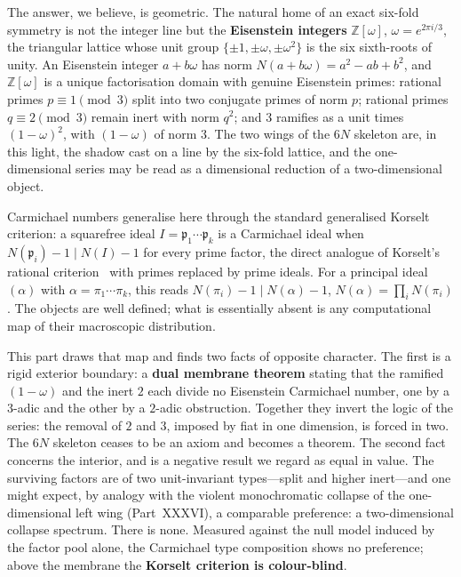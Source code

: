 \documentclass[11pt]{article}
\begin{document}
The answer, we believe, is geometric. The natural home of an exact six-fold symmetry is not the
integer line but the \textbf{Eisenstein integers} $\mathbb{Z}[\omega]$, $\omega=e^{2\pi i/3}$, the
triangular lattice whose unit group $\{\pm1,\pm\omega,\pm\omega^2\}$ is the six sixth-roots of unity.
An Eisenstein integer $a+b\omega$ has norm $N(a+b\omega)=a^2-ab+b^2$, and $\mathbb{Z}[\omega]$ is a
unique factorisation domain with genuine Eisenstein primes: rational primes $p\equiv1\pmod3$ split
into two conjugate primes of norm $p$; rational primes $q\equiv2\pmod3$ remain inert with norm $q^2$;
and $3$ ramifies as a unit times $(1-\omega)^2$, with $(1-\omega)$ of norm $3$. The two wings of the
$6N$ skeleton are, in this light, the shadow cast on a line by the six-fold lattice, and the
one-dimensional series may be read as a dimensional reduction of a two-dimensional object.

Carmichael numbers generalise here through the standard generalised Korselt criterion: a squarefree
ideal $I=\mathfrak{p}_1\cdots\mathfrak{p}_k$ is a Carmichael ideal when $N(\mathfrak{p}_i)-1\mid N(I)-1$
for every prime factor, the direct analogue of Korselt's rational criterion~\cite{Korselt} with primes
replaced by prime ideals. For a principal ideal $(\alpha)$ with $\alpha=\pi_1\cdots\pi_k$, this reads
$N(\pi_i)-1\mid N(\alpha)-1$, $N(\alpha)=\prod_iN(\pi_i)$. The objects are well defined; what is
essentially absent is any computational map of their macroscopic distribution.

This part draws that map and finds two facts of opposite character. The first is a rigid exterior
boundary: a \textbf{dual membrane theorem} stating that the ramified $(1-\omega)$ and the inert $2$
each divide no Eisenstein Carmichael number, one by a $3$-adic and the other by a $2$-adic obstruction.
Together they invert the logic of the series: the removal of $2$ and $3$, imposed by fiat in one
dimension, is forced in two. The $6N$ skeleton ceases to be an axiom and becomes a theorem. The second
fact concerns the interior, and is a negative result we regard as equal in value. The surviving factors
are of two unit-invariant types---split and higher inert---and one might expect, by analogy with the
violent monochromatic collapse of the one-dimensional left wing (Part~XXXVI), a comparable preference:
a two-dimensional collapse spectrum. There is none. Measured against the null model induced by the
factor pool alone, the Carmichael type composition shows no preference; above the membrane the
\textbf{Korselt criterion is colour-blind}.
\end{document}
